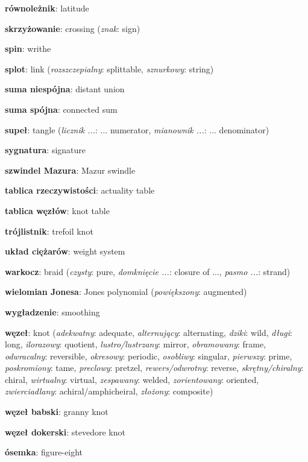 \item \textbf{równoleżnik}: latitude
\item \textbf{skrzyżowanie}: crossing
(\emph{znak}: sign)
\item \textbf{spin}: writhe
\item \textbf{splot}: link
(\emph{rozszczepialny}: splittable, \emph{sznurkowy}: string)
\item \textbf{suma niespójna}: distant union
\item \textbf{suma spójna}: connected sum
\item \textbf{supeł}: tangle
(\emph{licznik ...}: ... numerator, \emph{mianownik ...}: ... denominator)
\item \textbf{sygnatura}: signature
\item \textbf{szwindel Mazura}: Mazur swindle
\item \textbf{tablica rzeczywistości}: actuality table
\item \textbf{tablica węzłów}: knot table
\item \textbf{trójlistnik}: trefoil knot
\item \textbf{układ ciężarów}: weight system
\item \textbf{warkocz}: braid
(\emph{czysty}: pure, \emph{domknięcie ...}: closure of ..., \emph{pasmo ...}: strand)
\item \textbf{wielomian Jonesa}: Jones polynomial
(\emph{powiększony}: augmented)
\item \textbf{wygładzenie}: smoothing
\item \textbf{węzeł}: knot
(\emph{adekwatny}: adequate, \emph{alternujący}: alternating, \emph{dziki}: wild, \emph{długi}: long, \emph{ilorazowy}: quotient, \emph{lustro/lustrzany}: mirror, \emph{obramowany}: frame, \emph{odwracalny}: reversible, \emph{okresowy}: periodic, \emph{osobliwy}: singular, \emph{pierwszy}: prime, \emph{poskromiony}: tame, \emph{preclowy}: pretzel, \emph{rewers/odwrotny}: reverse, \emph{skrętny/chiralny}: chiral, \emph{wirtualny}: virtual, \emph{zespawany}: welded, \emph{zorientowany}: oriented, \emph{zwierciadlany}: achiral/amphicheiral, \emph{złożony}: composite)
\item \textbf{węzeł babski}: granny knot
\item \textbf{węzeł dokerski}: stevedore knot
\item \textbf{ósemka}: figure-eight
